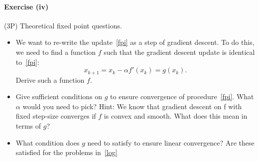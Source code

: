\documentclass{scrartcl}
\theoremstyle{definition}
\begin{document}
\paragraph{Exercise (iv)} (3P) Theoretical fixed point questions.
\begin{itemize}
  \item We want to re-write the update~\eqref{fpi} as a step of gradient descent. To do this, we need to find a function $f$
        such that the gradient descent update is identical to~\eqref{fpi}:
        \begin{equation}
          x_{k+1} = x_k - \alpha f'(x_k) = g(x_k) .
        \end{equation}
        Derive such a function $f$.
  \item Give sufficient conditions on $g$ to ensure convergence of procedure~\eqref{fpi}. What $\alpha$ would you need to pick?
        Hint: We know that gradient descent on f with fixed step-size converges if $f$ is convex and smooth. What
        does this mean in terms of $g$?
  \item What condition does $g$ need to satisfy to ensure linear convergence? Are these satisfied for the problems in~\eqref{log}
\end{itemize}
\end{document}
